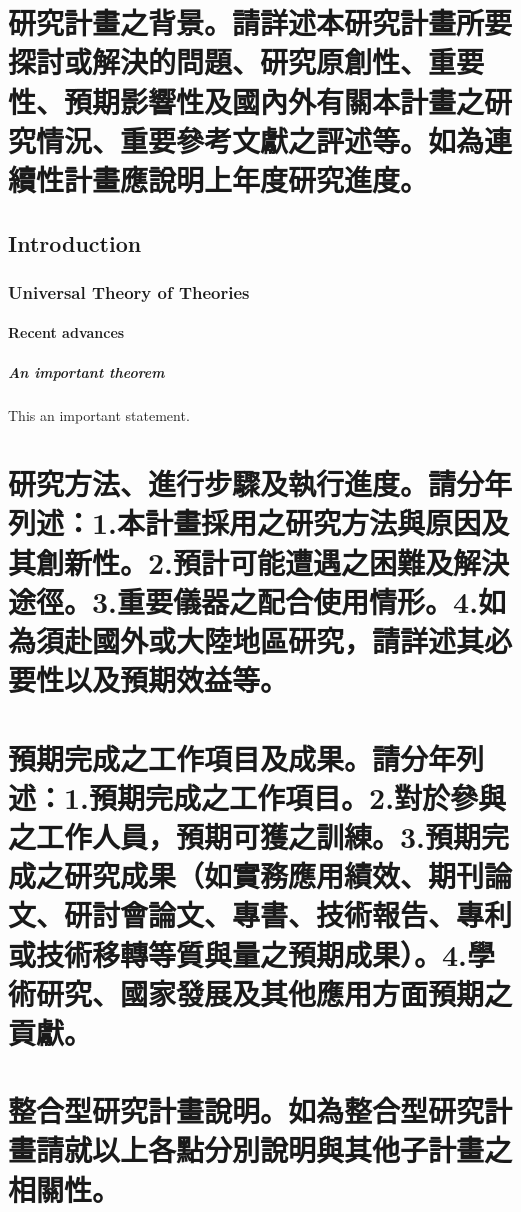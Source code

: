 \documentclass{cm03}
\begin{document}
\section{研究計畫之背景。請詳述本研究計畫所要探討或解決的問題、研究原創性、重要性、預期影響性及國內外有關本計畫之研究情況、重要參考文獻之評述等。如為連續性計畫應說明上年度研究進度。}

\subsection{Introduction}

\blindtext

\subsubsection{Universal Theory of Theories}

\blindtext

\paragraph{Recent advances}

\blindtext

\subparagraph{An important theorem}

\begin{theorem}
  This an important statement.
\end{theorem}

\section{研究方法、進行步驟及執行進度。請分年列述：1.本計畫採用之研究方法與原因及其創新性。2.預計可能遭遇之困難及解決途徑。3.重要儀器之配合使用情形。4.如為須赴國外或大陸地區研究，請詳述其必要性以及預期效益等。}

\section{預期完成之工作項目及成果。請分年列述：1.預期完成之工作項目。2.對於參與之工作人員，預期可獲之訓練。3.預期完成之研究成果（如實務應用績效、期刊論文、研討會論文、專書、技術報告、專利或技術移轉等質與量之預期成果）。4.學術研究、國家發展及其他應用方面預期之貢獻。}

\section{整合型研究計畫說明。如為整合型研究計畫請就以上各點分別說明與其他子計畫之相關性。}

\nocite{greenwade93}



\end{document}

